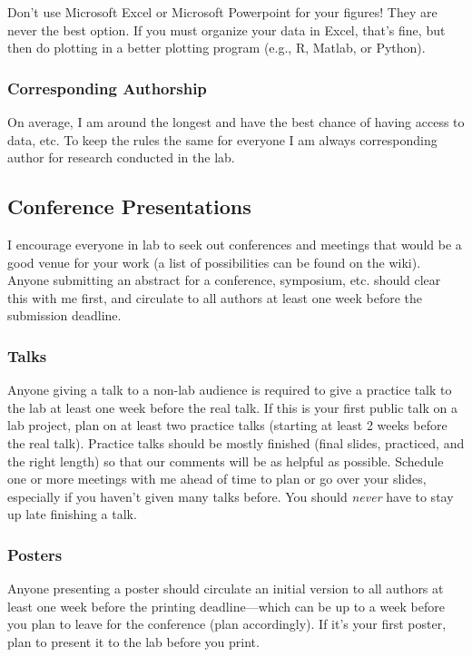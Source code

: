 \documentclass[letterpaper,11pt,oneside]{memoir}
\begin{document}
\begin{shaded}
\noindent Don't use Microsoft Excel or Microsoft Powerpoint for your figures! They are never the best option. If you must organize your data in Excel, that's fine, but then do plotting in a better plotting program (e.g., R, Matlab, or Python).
\end{shaded}


\subsubsection{Corresponding Authorship}
On average, I am around the longest and have the best chance of having access to data, etc. To keep the rules the same for everyone I am always corresponding author for research conducted in the lab.



\subsection{Conference Presentations}
I encourage everyone in lab to seek out conferences and meetings that would be a good venue for your work (a list of possibilities can be found on the wiki). Anyone submitting an abstract for a conference, symposium, etc. should clear this with me first, and circulate to all authors at least one week before the submission deadline.

\subsubsection{Talks}
Anyone giving a talk to a non-lab audience is required to give a practice talk to the lab at least one week before the real talk. If this is your first public talk on a lab project, plan on at least two practice talks (starting at least 2 weeks before the real talk). Practice talks should be mostly finished (final slides, practiced, and the right length) so that our comments will be as helpful as possible. Schedule one or more meetings with me ahead of time to plan or go over your slides, especially if you haven't given many talks before. You should \textit{never} have to stay up late finishing a talk.

\subsubsection{Posters}
Anyone presenting a poster should circulate an initial version to all authors at least one week before the printing deadline---which can be up to a week before you plan to leave for the conference (plan accordingly). If it's your first poster, plan to present it to the lab before you print. 
\end{document}
